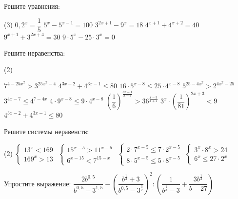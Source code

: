 \begin{class}[number=6]
	\begin{listofex}
		\item Решите уравнения:
		\begin{tasks}(3)
			\task \( 0,2^x=\dfrac{1}{5} \)
			\task \( 5^x-5^{x-1}=100 \)
			\task \( 3^{2x+1}-9^x=18 \)
			\task \( 4^{x+1}+4^{x+2}=40 \)
			\task \( 9^{x+1}+3^{2x+4}=30 \)
			\task \( 9\cdot 5^x-25 \cdot 3^x=0 \)
		\end{tasks}
		\item Решите неравенства: %
		\begin{tasks}(2)
			
			\task \( 7^{4-25x^2} > 3^{25x^2-4} \)
			\task \( 4^{3x-2} + 4^{3x-1} \le 80 \)
			\task \( 16 \cdot 5^{x-8} \le 25 \cdot 4^{x-8} \)
			\task \( 5^{25-4x^2} > 2^{4x^2-25} \)
			\task \( 3^{4x-7} \le 4^{7-4x}  \)
			\task \( 4 \cdot 9^{x-8} \le 9 \cdot 4^{x-8} \)
			\task \( \left( \dfrac{1}{6} \right)^{\frac{3x-1}{x-4}}> 36^{\frac{x-3}{x+4}} \)
			\task \( 3^x \cdot \left( \dfrac{1}{81} \right)^{2x+3} < 9  \)
			\task \( 4^{3x-2} + 4^{3x-1} \le 80 \)
		\end{tasks}
		\item Решите системы неравенств:
		\begin{tasks}(2)
			\task \( \begin{cases} 13^x<169 \\ 169^x > 13 \end{cases} \)
			\task \( \begin{cases} 15^{x-5}>11^{x-5} \\ 6^{x-15}<7^{15-x} \end{cases} \)
			\task \( \begin{cases} 2 \cdot 7^{x-5} \le 7 \cdot 2^{x-5} \\ 8 \cdot 5^{x-5} \le 5 \cdot 8^{x-5} \end{cases} \)
			\task \( \begin{cases} 3^x \cdot 8^x > 24 \\ 6^x \le 27 \cdot 2^x \end{cases} \)
		\end{tasks}
		\item Упростите выражение: \( \dfrac{2b^{0,5}}{b^{0,5}-3^{1,5}} - \left( \dfrac{b^{\tfrac{1}{3}}+3}{b^{0,5}-3^{\tfrac{3}{2}}} \right)^2 : \left( \dfrac{1}{b^{\tfrac{1}{3}}-3} + \dfrac{3b^{\tfrac{1}{3}}}{b-27} \right) \)
		
	\end{listofex}
\end{class}
	
